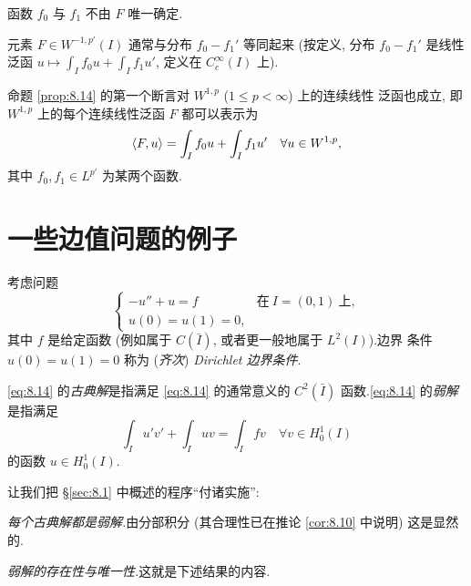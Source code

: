 \begin{remark}
\label{rem:8.19}
函数 $f_0$ 与 $f_1$ 不由 $F$ 唯一确定.
\end{remark}

\begin{remark}
\label{rem:8.20}
元素 $F\in W^{-1,p'}(I)$ 通常与分布 $f_0-f_1'$ 等同起来 (按定义, 分布
$f_0-f_1'$ 是线性泛函
$u\mapsto\int_I f_0u+\int_I f_1u'$, 定义在 $C_c^\infty(I)$ 上).
\end{remark}

\begin{remark}
\label{rem:8.21}
命题  \ref{prop:8.14} 的第一个断言对 $W^{1,p}$ ($1\le p<\infty$) 上的连续线性
泛函也成立, 即 $W^{1,p}$ 上的每个连续线性泛函 $F$ 都可以表示为
\begin{equation*}
\left\langle F,u\right\rangle=\int_I f_0u+\int_I f_1u'\quad\forall u\in W^{1,p},
\end{equation*}
其中 $f_0,f_1\in L^{p'}$ 为某两个函数.
\end{remark}

\section{一些边值问题的例子}
\label{sec:8.4}

考虑问题
\begin{equation}
\begin{cases}
-u''+u=f & \text{在}\ I=(0,1)\ \text{上},\\
u(0)=u(1)=0,
\end{cases}
\label{eq:8.14}
\end{equation}
其中 $f$ 是给定函数 (例如属于 $C(\bar I)$, 或者更一般地属于 $L^2(I)$).边界
条件 $u(0)=u(1)=0$ 称为 (\emph{齐次}) \emph{Dirichlet 边界条件}.

\begin{definition}
\eqref{eq:8.14} 的\emph{古典解}是指满足 \eqref{eq:8.14} 的通常意义的
$C^2(\bar I)$ 函数.\eqref{eq:8.14} 的\emph{弱解}是指满足
\begin{equation}
\int_I u'v'+\int_I uv=\int_I fv\quad\forall v\in H_0^1(I)
\label{eq:8.15}
\end{equation}
的函数 $u\in H_0^1(I)$.
\end{definition}

让我们把 \S \ref{sec:8.1} 中概述的程序``付诸实施'':

 \emph{每个古典解都是弱解.}由分部积分 (其合理性已在推论
 \ref{cor:8.10} 中说明) 这是显然的.

 \emph{弱解的存在性与唯一性.}这就是下述结果的内容.

